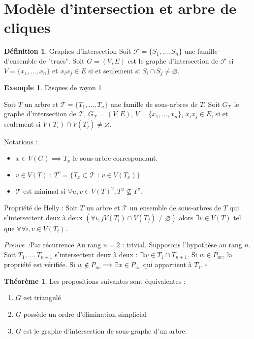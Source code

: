 \documentclass{book}
\theoremstyle{definition}
\newtheorem{theorem}{Théorème}
\newtheorem{definition}{Définition}
\newtheorem{example}{Exemple}
\numberwithin{lemma}{subsection}
\numberwithin{theorem}{subsection}
\numberwithin{definition}{subsection}
\numberwithin{proposition}{subsection}
\numberwithin{corollary}{subsection}
\numberwithin{property}{subsection}
\numberwithin{example}{subsection}
\numberwithin{heuristique}{subsection}
\numberwithin{scenario}{subsection}
\newenvironment{proofi} {\noindent\emph{Preuve~:}} {\hfill $\square$\vspace{0.2cm}}
\begin{document}
\section{Modèle d'intersection et arbre de cliques}

\begin{definition}{Graphes d'intersection}
Soit $\mathcal{F} = \{S_1, ... , S_n \}$ une famille d'ensemble de "trucs". Soit $G = (V, E)$ est le graphe d'intersection de $\mathcal{F}$ si $V = \{ x_1, ..., x_n\}$ et $x_ix_j \in E$ si et seulement si $S_i \cap S_j \neq \varnothing$.
\end{definition}

\begin{example}{Disques de rayon 1}
\end{example}

Soit $T$ un arbre et $\mathcal{T} = \{ T_1, ..., T_n \}$ une famille de sous-arbres de $T$. Soit $G_{\mathcal{T}}$ le graphe d'intersection de $\mathcal{T}$, $G_{\mathcal{T}} = (V, E)$, $V = \{x_1, ..., x_n\}$, $x_ix_j \in E$, si et seulement si $V(T_i) \cap V(T_j) \neq \varnothing$.

Notations :
\begin{itemize}
    \item $x \in V(G) \implies T_x $ le sous-arbre correspondant. 
    \item $v \in V(T)$ : $T^v = \{T_x \subset \mathcal{T}$ : $v \in V(T_x) \}$
    \item $\mathcal{T}$ est minimal si $\forall u, v \in V(T)^2, T^u \nsubseteq T^v$.
\end{itemize}

Propriété de Helly :
Soit $T$ un arbre et $\mathcal{T}$ un ensemble de sous-arbres de $T$ qui s'intersectent deux à deux $(\forall i, j V(T_i) \cap V(T_j) \neq \varnothing)$ alors $\exists v \in V(T)$ tel que $\forall \forall i, v \in V(T_i)$.

\begin{proofi}{Par récurrence}
Au rang $n = 2$ : trivial.
Supposons l'hypothèse au rang $n$.
Soit $T_1, ..., T_{n+1}$ s'intersectent deux à deux : %
$\exists w \in T_1 \cap T_{n+1}$. Si $w \in P_{uv}$, la propriété est vérifiée. Si $w \notin P_{uv} \implies \exists x \in P_{uv}$ qui appartient à $T_1$.
\end{proofi}

\begin{theorem}
 Les propositions suivantes sont équivalentes :
 \begin{enumerate}

     \item $G$ est triangulé
     \item $G$ possède un ordre d'élimination simplicial
     \item $G$ est le graphe d'intersection de sous-graphe d'un arbre.
 \end{enumerate}
\end{theorem}
\end{document}
